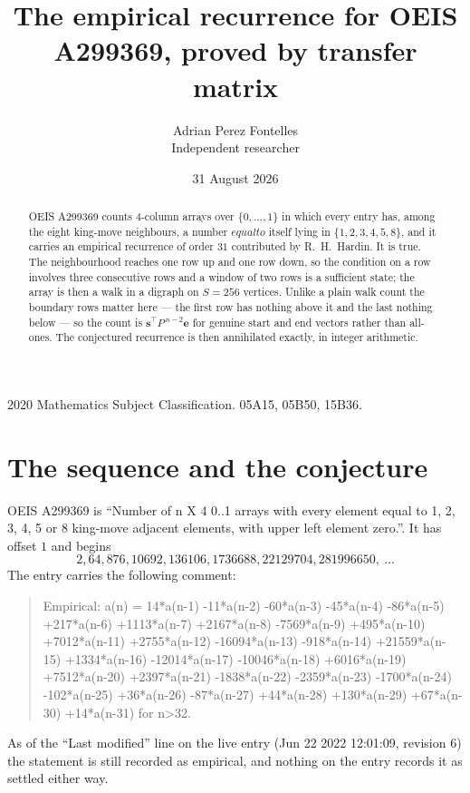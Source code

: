 \documentclass[11pt,a4paper]{article}
\title{The empirical recurrence for OEIS A299369, proved by transfer matrix}
\author{Adrian Perez Fontelles\\ \small Independent researcher}
\date{31 August 2026}
\theoremstyle{plain}
\theoremstyle{definition}
\begin{document}
\maketitle

\begin{abstract}
OEIS A299369 counts $4$-column arrays over $\{0,\dots,1\}$ in which every entry has,
among the eight king-move neighbours, a number $equal to$ itself lying in $\{1,2,3,4,5,8\}$, and it carries an empirical
recurrence of order $31$ contributed by R.~H.~Hardin. It is true. The neighbourhood
reaches one row up and one row down, so the condition on a row involves three consecutive
rows and a window of two rows is a sufficient state; the array is then a walk in a digraph
on $S=256$ vertices. Unlike a plain walk count the boundary rows matter here --- the first
row has nothing above it and the last nothing below --- so the count is
$\mathbf{s}^{\!\top}P^{\,n-2}\mathbf{e}$ for genuine start and end vectors rather than
all-ones. The conjectured recurrence is then annihilated exactly, in integer arithmetic.
\end{abstract}

\noindent\small 2020 Mathematics Subject Classification. 05A15, 05B50, 15B36.\normalsize

\section{The sequence and the conjecture}

OEIS A299369 is ``Number of n X 4 0..1 arrays with every element equal to 1, 2, 3, 4, 5 or 8 king-move adjacent elements, with upper left element zero.''. It has offset
$1$ and begins
\[
2, 64, 876, 10692, 136106, 1736688, 22129704, 281996650,\ \dots
\]
The entry carries the following comment:
\begin{quote}\small
Empirical: a(n) = 14*a(n-1) -11*a(n-2) -60*a(n-3) -45*a(n-4) -86*a(n-5) +217*a(n-6) +1113*a(n-7) +2167*a(n-8) -7569*a(n-9) +495*a(n-10) +7012*a(n-11) +2755*a(n-12) -16094*a(n-13) -918*a(n-14) +21559*a(n-15) +1334*a(n-16) -12014*a(n-17) -10046*a(n-18) +6016*a(n-19) +7512*a(n-20) +2397*a(n-21) -1838*a(n-22) -2359*a(n-23) -1700*a(n-24) -102*a(n-25) +36*a(n-26) -87*a(n-27) +44*a(n-28) +130*a(n-29) +67*a(n-30) +14*a(n-31) for n>32.
\end{quote}
As of the ``Last modified'' line on the live entry (Jun 22 2022 12:01:09, revision
6) the statement is still recorded as empirical, and nothing on the entry
records it as settled either way.
\end{document}
